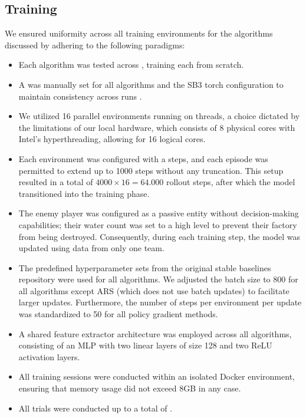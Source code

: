 \subsection{Training}
\label{sec:single-unit-training}

\noindent We ensured uniformity across all training environments for the algorithms discussed by adhering to the following paradigms:

\begin{itemize}[itemsep=1pt, parsep=0pt]

\item Each algorithm was tested across , training each from scratch.

\item A  was manually set for all algorithms and the SB3 torch configuration to maintain consistency across runs \protect\footnotemark.

\item We utilized 16 parallel environments running on threads, a choice dictated by the limitations of our local hardware, which consists of 8 physical cores with Intel's hyperthreading, allowing for 16 logical cores.

\item Each environment was configured with a  steps, and each episode was permitted to extend up to 1000 steps without any truncation. This setup resulted in a total of $4000 \times 16 = 64.000$ rollout steps, after which the model transitioned into the training phase.

\item The enemy player was configured as a passive entity without decision-making capabilities; their water count was set to a high level to prevent their factory from being destroyed. Consequently, during each training step, the model was updated using data from only one team.

\item The predefined hyperparameter sets from the original stable baselines repository were used for all algorithms. We adjusted the batch size to 800 for all algorithms except ARS (which does not use batch updates) to facilitate larger updates. Furthermore, the number of steps per environment per update was standardized to 50 for all policy gradient methods.

\item A shared feature extractor architecture was employed across all algorithms, consisting of an MLP with two linear layers of size 128 and two ReLU activation layers.

\item All training sessions were conducted within an isolated Docker environment, ensuring that memory usage did not exceed 8GB in any case.

\item All trials were conducted up to a total of .

\end{itemize}

